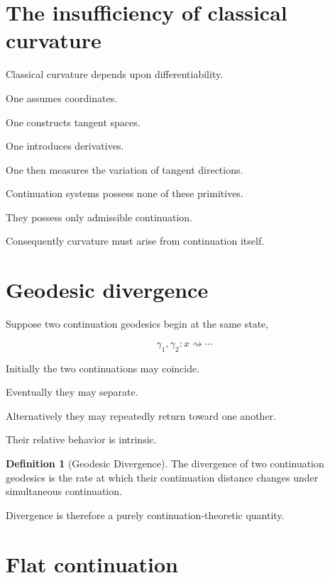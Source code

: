 \documentclass[13pt,openany]{book}
\theoremstyle{plain}
\theoremstyle{definition}
\newtheorem{definition}{Definition}[chapter]
\begin{document}
\section{The insufficiency of classical curvature}

Classical curvature depends upon differentiability.

One assumes coordinates.

One constructs tangent spaces.

One introduces derivatives.

One then measures the variation of tangent directions.

Continuation systems possess none of these primitives.

They possess only admissible continuation.

Consequently curvature must arise from continuation itself.


\section{Geodesic divergence}

Suppose two continuation geodesics begin at the same state,

\[
\gamma_1,\gamma_2:
x
\rightsquigarrow
\cdots
\]

Initially the two continuations may coincide.

Eventually they may separate.

Alternatively they may repeatedly return toward one another.

Their relative behavior is intrinsic.

\begin{definition}[Geodesic Divergence]

The divergence of two continuation geodesics is the rate at which their continuation distance changes under simultaneous continuation.

\end{definition}

Divergence is therefore a purely continuation-theoretic quantity.


\section{Flat continuation}
\end{document}
